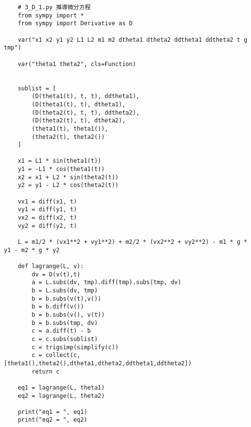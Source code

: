 \documentclass[UTF8,a4paper,12pt]{article}
\begin{document}
\begin{lstlisting}
    # 3_D_1.py 推導微分方程
    from sympy import *
    from sympy import Derivative as D
    
    var("x1 x2 y1 y2 L1 L2 m1 m2 dtheta1 dtheta2 ddtheta1 ddtheta2 t g tmp")
    
    var("theta1 theta2", cls=Function)
    
    
    sublist = [
        (D(theta1(t), t, t), ddtheta1),
        (D(theta1(t), t), dtheta1),
        (D(theta2(t), t, t), ddtheta2),
        (D(theta2(t), t), dtheta2),
        (theta1(t), theta1()),
        (theta2(t), theta2())
    ]
    
    x1 = L1 * sin(theta1(t))
    y1 = -L1 * cos(theta1(t))
    x2 = x1 + L2 * sin(theta2(t))
    y2 = y1 - L2 * cos(theta2(t))
    
    vx1 = diff(x1, t)
    vy1 = diff(y1, t)
    vx2 = diff(x2, t)
    vy2 = diff(y2, t)
    
    L = m1/2 * (vx1**2 + vy1**2) + m2/2 * (vx2**2 + vy2**2) - m1 * g * y1 - m2 * g * y2
    
    def lagrange(L, v):
        dv = D(v(t),t)
        a = L.subs(dv, tmp).diff(tmp).subs(tmp, dv)
        b = L.subs(dv, tmp)
        b = b.subs(v(t),v())
        b = b.diff(v())
        b = b.subs(v(), v(t))
        b = b.subs(tmp, dv)
        c = a.diff(t) - b
        c = c.subs(sublist)
        c = trigsimp(simplify(c))
        c = collect(c, [theta1(),theta2(),dtheta1,dtheta2,ddtheta1,ddtheta2])
        return c
    
    eq1 = lagrange(L, theta1)
    eq2 = lagrange(L, theta2)
    
    print("eq1 = ", eq1)
    print("eq2 = ", eq2)
\end{lstlisting}

\newpage
\end{document}

